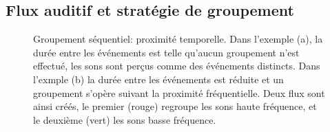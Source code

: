 \subsection{Flux auditif et stratégie de groupement}

\begin{figure}[bth]
        \myfloatalign
        \caption[Groupement séquentiel : proximité temporelle.]{Groupement séquentiel: proximité temporelle. Dans l'exemple (a), la durée entre les événements est telle qu'aucun groupement n'est effectué, les sons sont perçus comme des événements distincts. Dans l'exmple (b) la durée entre les événements est réduite et un groupement s'opère suivant la proximité fréquentielle. Deux flux sont ainsi créés, le premier (rouge) regroupe les sons haute fréquence, et le deuxième (vert) les sons basse fréquence.}\label{fig:tonesim}
\end{figure}


